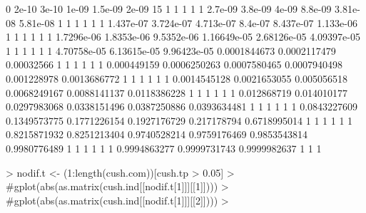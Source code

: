 \documentclass[12pt]{article}
\begin{document}
\begin{Schunk}
\begin{Soutput}
           0        2e-10        3e-10        1e-09      1.5e-09        2e-09 
          15            1            1            1            1            1 
     2.7e-09      3.8e-09        4e-09      8.8e-09     3.81e-08     5.81e-08 
           1            1            1            1            1            1 
   1.437e-07    3.724e-07    4.713e-07      8.4e-07    8.437e-07    1.133e-06 
           1            1            1            1            1            1 
  1.7296e-06   1.8353e-06   9.5352e-06  1.16649e-05  2.68126e-05  4.09397e-05 
           1            1            1            1            1            1 
 4.70758e-05  6.13615e-05  9.96423e-05 0.0001844673 0.0002117479   0.00032566 
           1            1            1            1            1            1 
 0.000449159 0.0006250263 0.0007580465 0.0007940498  0.001228978 0.0013686772 
           1            1            1            1            1            1 
0.0014545128 0.0021653055  0.005056518 0.0068249167 0.0088141137 0.0118386228 
           1            1            1            1            1            1 
 0.012868719  0.014010177 0.0297983068 0.0338151496 0.0387250886 0.0393634481 
           1            1            1            1            1            1 
0.0843227609 0.1349573775 0.1771226154 0.1927176729  0.217178794 0.6718995014 
           1            1            1            1            1            1 
0.8215871932 0.8251213404 0.9740528214 0.9759176469 0.9853543814 0.9980776489 
           1            1            1            1            1            1 
0.9994863277 0.9999731743 0.9999982637 
           1            1            1 
\end{Soutput}
\begin{Sinput}
> nodif.t <- (1:length(cush.com))[cush.tp > 0.05]
>                                         #gplot(abs(as.matrix(cush.ind[[nodif.t[1]]][[1]])))
>                                         #gplot(abs(as.matrix(cush.ind[[nodif.t[1]]][[2]])))
> 
\end{Sinput}
\end{Schunk}
\end{document}
